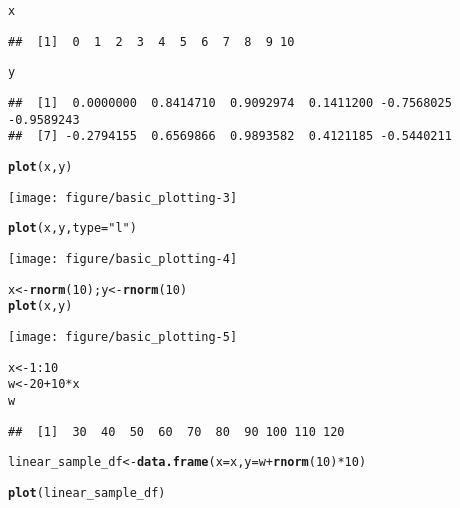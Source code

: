 \documentclass[a4paper,10pt]{book}\usepackage[]{graphicx}\usepackage[]{color}
\makeatletter
\def\maxwidth{ %
  \ifdim\Gin@nat@width>\linewidth
    \linewidth
  \else
    \Gin@nat@width
  \fi
}
\newcommand{\hlnum}[1]{\textcolor[rgb]{0.686,0.059,0.569}{#1}}%
\newcommand{\hlstr}[1]{\textcolor[rgb]{0.192,0.494,0.8}{#1}}%
\newcommand{\hlopt}[1]{\textcolor[rgb]{0,0,0}{#1}}%
\newcommand{\hlstd}[1]{\textcolor[rgb]{0.345,0.345,0.345}{#1}}%
\newcommand{\hlkwb}[1]{\textcolor[rgb]{0.69,0.353,0.396}{#1}}%
\newcommand{\hlkwc}[1]{\textcolor[rgb]{0.333,0.667,0.333}{#1}}%
\newcommand{\hlkwd}[1]{\textcolor[rgb]{0.737,0.353,0.396}{\textbf{#1}}}%
\newenvironment{kframe}{%
 \def\at@end@of@kframe{}%
 \ifinner\ifhmode%
  \def\at@end@of@kframe{\end{minipage}}%
  \begin{minipage}{\columnwidth}%
 \fi\fi%
 \def\FrameCommand##1{\hskip\@totalleftmargin \hskip-\fboxsep
 \colorbox{shadecolor}{##1}\hskip-\fboxsep
     \hskip-\linewidth \hskip-\@totalleftmargin \hskip\columnwidth}%
 \MakeFramed {\advance\hsize-\width
   \@totalleftmargin\z@ \linewidth\hsize
   \@setminipage}}%
 {\par\unskip\endMakeFramed%
 \at@end@of@kframe}
\newenvironment{knitrout}{}{} %
\makeatother
\begin{document}
\begin{knitrout}
\begin{kframe}
\begin{alltt}
\hlstd{x}
\end{alltt}
\begin{verbatim}
##  [1]  0  1  2  3  4  5  6  7  8  9 10
\end{verbatim}
\begin{alltt}
\hlstd{y}
\end{alltt}
\begin{verbatim}
##  [1]  0.0000000  0.8414710  0.9092974  0.1411200 -0.7568025 -0.9589243
##  [7] -0.2794155  0.6569866  0.9893582  0.4121185 -0.5440211
\end{verbatim}
\begin{alltt}
\hlkwd{plot}\hlstd{(x, y)}
\end{alltt}
\end{kframe}
\texttt{[image: figure/basic\_plotting-3]} 
\begin{kframe}\begin{alltt}
\hlkwd{plot}\hlstd{(x, y,} \hlkwc{type}\hlstd{=}\hlstr{"l"}\hlstd{)}
\end{alltt}
\end{kframe}
\texttt{[image: figure/basic\_plotting-4]} 
\begin{kframe}\begin{alltt}
\hlstd{x} \hlkwb{<-} \hlkwd{rnorm}\hlstd{(}\hlnum{10}\hlstd{); y} \hlkwb{<-} \hlkwd{rnorm}\hlstd{(}\hlnum{10}\hlstd{)}
\hlkwd{plot}\hlstd{(x,y)}
\end{alltt}
\end{kframe}
\texttt{[image: figure/basic\_plotting-5]} 
\begin{kframe}\begin{alltt}
\hlstd{x} \hlkwb{<-} \hlnum{1}\hlopt{:}\hlnum{10}
\hlstd{w} \hlkwb{<-} \hlnum{20} \hlopt{+} \hlnum{10}\hlopt{*}\hlstd{x}
\hlstd{w}
\end{alltt}
\begin{verbatim}
##  [1]  30  40  50  60  70  80  90 100 110 120
\end{verbatim}
\begin{alltt}
\hlstd{linear_sample_df} \hlkwb{<-} \hlkwd{data.frame}\hlstd{(}\hlkwc{x}\hlstd{=x,} \hlkwc{y}\hlstd{=w} \hlopt{+} \hlkwd{rnorm}\hlstd{(}\hlnum{10}\hlstd{)}\hlopt{*}\hlnum{10}\hlstd{)}

\hlkwd{plot}\hlstd{(linear_sample_df)}


\end{alltt}
\end{kframe}
\end{knitrout}
\end{document}
